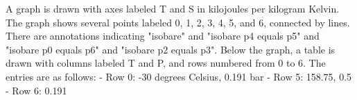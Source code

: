 A graph is drawn with axes labeled T and S in kilojoules per kilogram Kelvin. The graph shows several points labeled 0, 1, 2, 3, 4, 5, and 6, connected by lines. There are annotations indicating "isobare" and "isobare p4 equals p5" and "isobare p0 equals p6" and "isobare p2 equals p3". Below the graph, a table is drawn with columns labeled T and P, and rows numbered from 0 to 6. The entries are as follows:
- Row 0: -30 degrees Celsius, 0.191 bar
- Row 5: 158.75, 0.5
- Row 6: 0.191